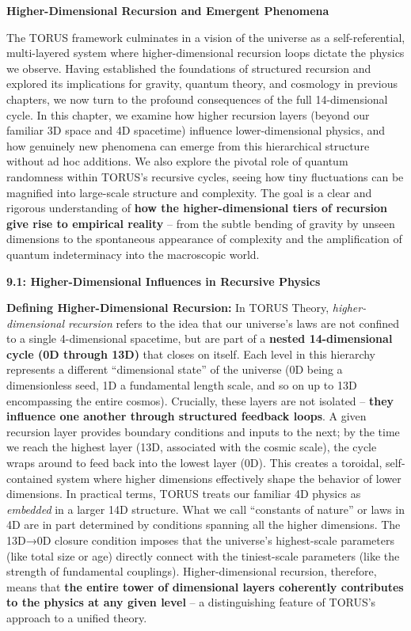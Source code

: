 \documentclass[
]{article}
\begin{document}
{\textbf{Higher-Dimensional Recursion and Emergent Phenomena}

The TORUS framework culminates in a vision of the universe as a
self-referential, multi-layered system where higher-dimensional
recursion loops dictate the physics we observe. Having established the
foundations of structured recursion and explored its implications for
gravity, quantum theory, and cosmology in previous chapters, we now turn
to the profound consequences of the full 14-dimensional cycle. In this
chapter, we examine how higher recursion layers (beyond our familiar 3D
space and 4D spacetime) influence lower-dimensional physics, and how
genuinely new phenomena can emerge from this hierarchical structure
without ad hoc additions. We also explore the pivotal role of quantum
randomness within TORUS's recursive cycles, seeing how tiny fluctuations
can be magnified into large-scale structure and complexity. The goal is
a clear and rigorous understanding of \textbf{how the higher-dimensional
tiers of recursion give rise to empirical reality} -- from the subtle
bending of gravity by unseen dimensions to the spontaneous appearance of
complexity and the amplification of quantum indeterminacy into the
macroscopic world.

\textbf{9.1: Higher-Dimensional Influences in Recursive Physics}

\textbf{Defining Higher-Dimensional Recursion:} In TORUS Theory,
\emph{higher-dimensional recursion} refers to the idea that our
universe's laws are not confined to a single 4-dimensional spacetime,
but are part of a \textbf{nested 14-dimensional cycle (0D through 13D)}
that closes on itself. Each level in this hierarchy represents a
different ``dimensional state'' of the universe (0D being a
dimensionless seed, 1D a fundamental length scale, and so on up to 13D
encompassing the entire cosmos). Crucially, these layers are not
isolated -- \textbf{they influence one another through structured
feedback loops}. A given recursion layer provides boundary conditions
and inputs to the next; by the time we reach the highest layer (13D,
associated with the cosmic scale), the cycle wraps around to feed back
into the lowest layer (0D). This creates a toroidal, self-contained
system where higher dimensions effectively shape the behavior of lower
dimensions. In practical terms, TORUS treats our familiar 4D physics as
\emph{embedded} in a larger 14D structure. What we call ``constants of
nature'' or laws in 4D are in part determined by conditions spanning all
the higher dimensions\hspace{0pt}. The 13D→0D closure condition imposes
that the universe's highest-scale parameters (like total size or age)
directly connect with the tiniest-scale parameters (like the strength of
fundamental couplings). Higher-dimensional recursion, therefore, means
that \textbf{the entire tower of dimensional layers coherently
contributes to the physics at any given level} -- a distinguishing
feature of TORUS's approach to a unified theory.

}
\end{document}
